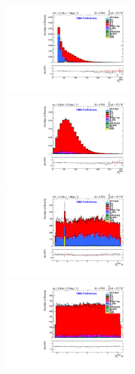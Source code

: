\documentclass[oneside, a4paper, 11pt, ]{report}
\begin{document}
\begin{figure}
\includegraphics[width=0.5\textwidth]{Plots/ControlPlots/TTbarDiLeptonAnalysis/EE/MET/patType1CorrectedPFMet/MET_splitTTbar_ratio.pdf}
\includegraphics[width=0.5\textwidth]{Plots/ControlPlots/TTbarDiLeptonAnalysis/EMu/MET/patType1CorrectedPFMet/MET_splitTTbar_ratio.pdf}\\
\includegraphics[width=0.5\textwidth]{Plots/ControlPlots/TTbarDiLeptonAnalysis/EE/MET/patType1CorrectedPFMet/MET_phi_splitTTbar_ratio.pdf}
\includegraphics[width=0.5\textwidth]{Plots/ControlPlots/TTbarDiLeptonAnalysis/EMu/MET/patType1CorrectedPFMet/MET_phi_splitTTbar_ratio.pdf}\\

\end{figure}
\end{document}
